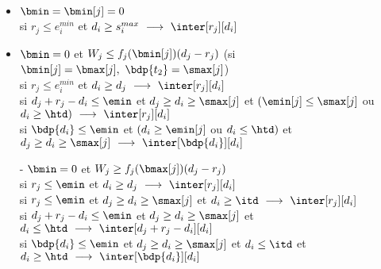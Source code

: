 \documentclass{report}
\begin{document}
\begin{itemize}
\item $\bmin = \bmin[j] = 0$\\
\vspace{0.2cm}
si $r_j \le e_i^{min}$ et $d_i \ge s_i^{max}\ \longrightarrow\ 
\inter[r_j][d_i]$\\
 
\vspace{0.5cm}
 
\item $\bmin=0$ et $W_j \le f_j(\bmin[j])(d_j-r_j)$ 
(si $\bmin[j]=\bmax[j],\ \bdp{t_2}=\smax[j]$)\\
\vspace{0.2cm}
si $r_j \le e_i^{min}$ et $d_i \ge d_j\ \longrightarrow\ \inter[r_j][d_i]$\\
\vspace{0.1cm}
si $d_j+r_j-d_i \le \emin$ et $d_j \ge d_i \ge \smax[j]$ et 
$(\emin[j] \le \smax[j]$ ou $d_i \ge \htd)\ \longrightarrow\ 
\inter[r_j][d_i]$\\
\vspace{0.1cm}
si $\bdp{d_i} \le \emin$ et $(d_i \ge \emin[j]$ ou $d_i \le \htd)$ 
  et $d_j \ge d_i \ge \smax[j]\ \longrightarrow\ 
\inter[\bdp{d_i}][d_i]$\\

\vspace{0.5cm}

\item[-] $\bmin=0$ et $W_j \ge f_j(\bmax[j])(d_j-r_j)$\\
\vspace{0.2cm}
si $r_j \le \emin$ et $d_i \ge d_j\ \longrightarrow\ \inter[r_j][d_i]$\\
\vspace{0.1cm}
si $r_j\le \emin$ et $d_j \ge d_i \ge \smax[j]$ et $d_i \ge \itd\ 
\longrightarrow\ \inter[r_j][d_i]$\\
\vspace{0.1cm}
si $d_j+r_j-d_i \le \emin$ et $d_j \ge d_i \ge \smax[j]$ et $d_i \le \htd\ 
\longrightarrow\ \inter[d_j+r_j-d_i][d_i]$\\
\vspace{0.1cm}
si $\bdp{d_i} \le \emin$ et $d_j \ge d_i \ge \smax[j]$ et $d_i \le \itd$ et 
  $d_i \ge \htd\ \longrightarrow\ \inter[\bdp{d_i}][d_i]$\\

\vspace{0.5cm}


\end{itemize}
\end{document}

